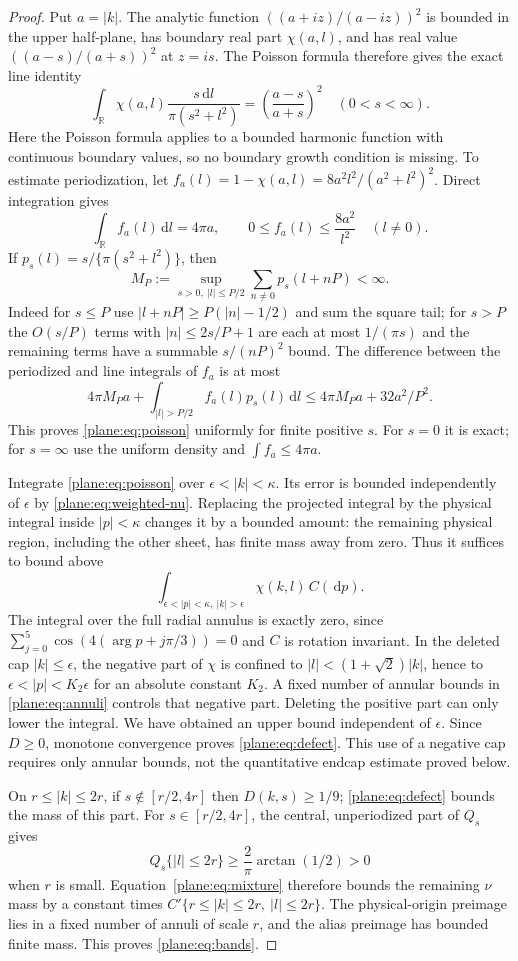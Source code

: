 \documentclass[11pt]{article}
\newcommand{\R}{\mathbb R}
\newcommand{\dd}{\,\mathrm d}
\theoremstyle{definition}
\theoremstyle{remark}
\numberwithin{equation}{section}
\begin{document}
\begin{proof}
Put $a=|k|$.  The analytic function
$((a+iz)/(a-iz))^2$ is bounded in the upper half-plane, has boundary
real part $\chi(a,l)$, and has real value $((a-s)/(a+s))^2$ at $z=is$.
The Poisson formula therefore gives the exact line identity
\begin{equation}
 \label{plane:eq:line-poisson}
 \int_\R\chi(a,l)\frac{s\dd l}{\pi(s^2+l^2)}
     =\left(\frac{a-s}{a+s}\right)^2\quad(0<s<\infty).
\end{equation}
Here the Poisson formula applies to a bounded harmonic function with
continuous boundary values, so no boundary growth condition is missing.
To estimate periodization, let
$f_a(l)=1-\chi(a,l)=8a^2l^2/(a^2+l^2)^2$.  Direct integration gives
\[
 \int_\R f_a(l)\dd l=4\pi a,
 \qquad 0\le f_a(l)\le\frac{8a^2}{l^2}\quad(l\ne0).
\]
If $p_s(l)=s/\{\pi(s^2+l^2)\}$, then
\[
 M_P:=\sup_{s>0,\ |l|\le P/2}\sum_{n\ne0}p_s(l+nP)<\infty.
\]
Indeed for $s\le P$ use $|l+nP|\ge P(|n|-1/2)$ and sum the
square tail; for $s>P$ the $O(s/P)$ terms with $|n|\le2s/P+1$
are each at most $1/(\pi s)$ and the remaining terms have a summable
$s/(nP)^2$ bound.  The difference between the periodized and line
integrals of $f_a$ is at most
\[
 4\pi M_Pa+
 \int_{|l|>P/2}f_a(l)p_s(l)\dd l
 \le4\pi M_Pa+32a^2/P^2.
\]
This proves \eqref{plane:eq:poisson} uniformly for finite positive $s$.
For $s=0$ it is exact; for $s=\infty$ use the uniform density and
$\int f_a\le4\pi a$.

Integrate \eqref{plane:eq:poisson} over
$\epsilon<|k|<\kappa$.  Its error is bounded independently of
$\epsilon$ by \eqref{plane:eq:weighted-nu}.
Replacing the projected integral by the physical integral inside
$|p|<\kappa$ changes it by a bounded amount: the remaining physical
region, including the other sheet, has finite mass away from zero.
Thus it suffices to bound above
\[
 \int_{\epsilon<|p|<\kappa,\ |k|>\epsilon}
                \chi(k,l)\,C(\dd p).
\]
The integral over the full radial annulus is exactly zero, since
$\sum_{j=0}^5\cos(4(\arg p+j\pi/3))=0$ and $C$ is rotation invariant.
In the deleted cap $|k|\le\epsilon$, the negative part of $\chi$ is
confined to $|l|<(1+\sqrt2)|k|$, hence to
$\epsilon<|p|<K_2\epsilon$ for an absolute constant $K_2$.
A fixed number of annular bounds in \eqref{plane:eq:annuli} controls
that negative part.  Deleting the positive part can only lower the
integral.  We have obtained an upper bound independent of $\epsilon$.
Since $D\ge0$, monotone convergence proves \eqref{plane:eq:defect}.
This use of a negative cap requires only annular bounds, not the
quantitative endcap estimate proved below.

On $r\le|k|\le2r$, if $s\notin[r/2,4r]$ then $D(k,s)\ge1/9$;
\eqref{plane:eq:defect} bounds the mass of this part.
For $s\in[r/2,4r]$, the central, unperiodized part of $Q_s$ gives
\[
 Q_s\{|l|\le2r\}\ge\frac2\pi\arctan(1/2)>0
\]
when $r$ is small.  Equation~\eqref{plane:eq:mixture} therefore bounds
the remaining $\nu$ mass by a constant times
$C'\{r\le|k|\le2r,\ |l|\le2r\}$.  The physical-origin preimage
lies in a fixed number of annuli of scale $r$, and the alias preimage
has bounded finite mass.  This proves \eqref{plane:eq:bands}.
\end{proof}
\end{document}
